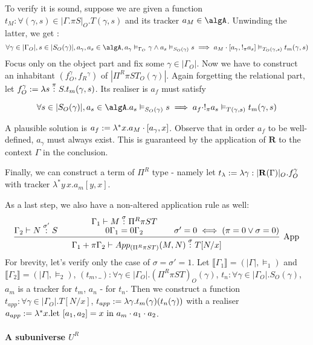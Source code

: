 \documentclass[12pt,a4paper]{article}
\renewcommand{\O}{_{O}}\alwaysmath{O}
\newcommand{\R}{\ensuremath{_{R}}}
\begin{document}
To verify it is sound, suppose we are given a function $t_M : \forall (\gamma , s) \in |\Gamma. \pi S|\O. T(\gamma, s)$ and its tracker $a_M \in \algA$. Unwinding the latter, we get :
$$\forall \gamma \in |\Gamma\O|, s \in |S\O(\gamma)|, a_\gamma, a_s \in \algA, a_\gamma \vDash_{\Gamma\O} \gamma \land a_s \vDash_{S\O(\gamma)} s \implies a_M \cdot [a_\gamma, !_\pi a_s] \vDash_{T\O(\gamma, s)} t_m(\gamma, s)$$
Focus only on the object part and fix some $\gamma \in |\Gamma\O|$. Now we have to construct an inhabitant $(f\O^\gamma, f\R^\gamma) $ of $|\Pi^R \pi S T\O(\gamma)|$. Again forgetting the relational part, let $f\O^\gamma \define \lambda s \overset{\pi}{:} S. t_m(\gamma, s)$. Its realiser is $a_f$ must satisfy

$$ \forall s \in |S\O(\gamma)|, a_s \in \algA . a_s \vDash_{S\O(\gamma)} s \implies a_f \cdot !_\pi a_s \vDash_{T(\gamma, s)} t_m(\gamma, s) $$

A plausible solution is $a_f := \lambda^* x. a_M \cdot [a_\gamma, x]$. Observe that in order $a_f$ to be well-defined, $a_\gamma$ must always exist. This is guaranteed by the application of $\mathbf{R}$ to the context $\Gamma$ in the conclusion. 

Finally, we can construct  a term of $\Pi^R$ type - namely let $t_\lambda \define \lambda \gamma : |\mathbf{R}(\Gamma)|\O. f\O^\gamma$ with tracker $\lambda^*y\, x.a_m[y, x]$.

As a last step, we also have a non-altered application rule as well:
$$
\infer[\text{App}]{\Gamma_1 + \pi\Gamma_2 \vdash App_{(\Pi^R\pi S T)}(M,N) \overset{\sigma}:T[N/x]}{
    \Gamma_2 \vdash N \overset{\sigma'}: S
    & \kern 3em
    \deduce{0\Gamma_1 = 0\Gamma_2}{
      \Gamma_1 \vdash M \overset{\sigma}: \Pi^R \pi S T
    } \kern 1em
    &
    \sigma'= 0 \iff (\pi = 0 \lor \sigma = 0)
}$$
For brevity, let's verify only the case of $\sigma = \sigma' = 1$. Let $\llbracket \Gamma_1 \rrbracket = (|\Gamma|, \vDash_1)$ and $\llbracket \Gamma_2 \rrbracket = (|\Gamma|, \vDash_2)$, 
$(t_m, \_) : \forall \gamma \in |\Gamma\O|. (\Pi^R\pi S T)\O(\gamma)$, $t_n : \forall \gamma \in |\Gamma\O|. S\O(\gamma)$, $a_m$ is a tracker for $t_m$, $a_n$ - for $t_n$. Then we construct a function $t_{app} : \forall \gamma \in |\Gamma\O|.T[N/x]$, $t_{app} := \lambda \gamma. t_m(\gamma)(t_n(\gamma))$ with a realiser $a_{app} := \lambda^* x. \text{let } [a_1, a_2] = x \text{ in } a_m \cdot a_1 \cdot a_2$.

\paragraph*{A subuniverse $U^R$}
\end{document}
